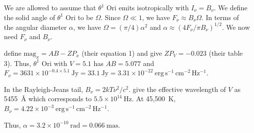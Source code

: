 %

\newslide

\begin{problem}
We are allowed to assume that $\theta^1$ Ori emits isotropically with $I_\nu = B_\nu$. We define the solid angle of $\theta^1$ Ori to be $\Omega$.
Since $\Omega \ll 1$, we have $F_\nu \approx B_\nu\Omega$. In terms of the angular diameter $\alpha$, we have $\Omega = (\pi/4) \alpha^2$ and $\alpha \approx (4F_\nu/\pi B_\nu)^{1/2}$. We now need $F_\nu$ and $B_\nu$. 

\cite{Bessell-2012} define $\mbox{mag}_x = AB - ZP_x$ (their equation 1) and give $ZP_V = -0.023$ (their table 3). Thus, $\theta^1$ Ori with $V = 5.1$ has $AB = 5.077$ and $F_\nu = 3631 \times 10^{-0.4 \times 5.1}~\mathrm{Jy} = 33.1~\mathrm{Jy} = 3.31\times 10^{-22}~\mathrm{erg\,s^{-1}\,cm^{-2}\,Hz^{-1}}$.

In the Rayleigh-Jeans tail, $B_\nu = 2kT\nu^2/c^2$. \cite{Bessell-2012} give the effective wavelength of $V$ as 5455~{\AA} which corresponds to $5.5 \times 10^{14}~\mathrm{Hz}$. At 45,500~K, $B_\nu = 4.22 \times 10^{-3}~\mathrm{erg\,s^{-1}\,cm^{-2}\,Hz^{-1}}$.

Thus, $\alpha = 3.2\times 10^{-10}~\mathrm{rad} = 0.066~\mathrm{mas}$.


\end{problem}


